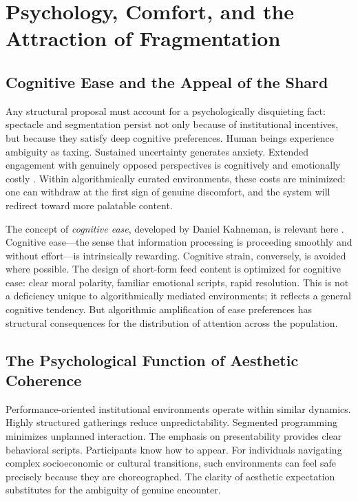 \documentclass[11pt]{article}
\begin{document}
\section{Psychology, Comfort, and the Attraction of Fragmentation}
\label{sec:psychology}

\subsection{Cognitive Ease and the Appeal of the Shard}

Any structural proposal must account for a psychologically disquieting fact: spectacle and segmentation persist not only because of institutional incentives, but because they satisfy deep cognitive preferences. Human beings experience ambiguity as taxing. Sustained uncertainty generates anxiety. Extended engagement with genuinely opposed perspectives is cognitively and emotionally costly \citep{Kahneman2011}. Within algorithmically curated environments, these costs are minimized: one can withdraw at the first sign of genuine discomfort, and the system will redirect toward more palatable content.

The concept of \emph{cognitive ease}, developed by Daniel Kahneman, is relevant here \citep{Kahneman2011}. Cognitive ease---the sense that information processing is proceeding smoothly and without effort---is intrinsically rewarding. Cognitive strain, conversely, is avoided where possible. The design of short-form feed content is optimized for cognitive ease: clear moral polarity, familiar emotional scripts, rapid resolution. This is not a deficiency unique to algorithmically mediated environments; it reflects a general cognitive tendency. But algorithmic amplification of ease preferences has structural consequences for the distribution of attention across the population.

\subsection{The Psychological Function of Aesthetic Coherence}

Performance-oriented institutional environments operate within similar dynamics. Highly structured gatherings reduce unpredictability. Segmented programming minimizes unplanned interaction. The emphasis on presentability provides clear behavioral scripts. Participants know how to appear. For individuals navigating complex socioeconomic or cultural transitions, such environments can feel safe precisely because they are choreographed. The clarity of aesthetic expectation substitutes for the ambiguity of genuine encounter.
\end{document}
